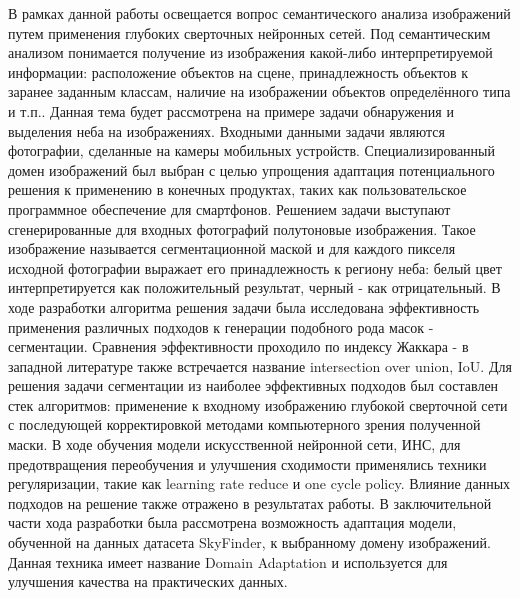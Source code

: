 \usepackage{amsmath}
\usepackage{cleveref}







\Intro

В рамках данной работы освещается вопрос семантического анализа изображений путем применения глубоких сверточных нейронных сетей.
Под семантическим анализом понимается получение из изображения какой-либо интерпретируемой информации: расположение объектов на сцене,
принадлежность объектов к заранее заданным классам, наличие на изображении объектов определённого типа и т.п..
Данная тема будет рассмотрена на примере задачи обнаружения и выделения неба на изображениях.
Входными данными задачи являются фотографии, сделанные на камеры мобильных устройств.
Специализированный домен изображений был выбран с целью упрощения адаптация потенциального решения к применению в конечных продуктах,
таких как пользовательское программное обеспечение для смартфонов.
Решением задачи выступают сгенерированные для входных фотографий полутоновые изображения.
Такое изображение называется сегментационной маской и для каждого пикселя исходной фотографии выражает его принадлежность
к региону неба: белый цвет интерпретируется как положительный результат, черный - как отрицательный.
В ходе разработки алгоритма решения задачи была исследована эффективность применения различных подходов к генерации подобного рода масок - сегментации.
Сравнения эффективности проходило по индексу Жаккара - в западной литературе также встречается название intersection over union, IoU\@.
Для решения задачи сегментации из наиболее эффективных подходов был составлен стек алгоритмов: применение к входному изображению глубокой сверточной сети
с последующей корректировкой методами компьютерного зрения полученной маски.
В ходе обучения модели искусственной нейронной сети, ИНС, для предотвращения переобучения и улучшения сходимости
применялись техники регуляризации, такие как learning rate reduce и one cycle policy.
Влияние данных подходов на решение также отражено в результатах работы.
В заключительной части хода разработки была рассмотрена возможность адаптация модели, обученной на данных датасета SkyFinder,
к выбранному домену изображений.
Данная техника имеет название Domain Adaptation и используется для улучшения качества на практических данных.

